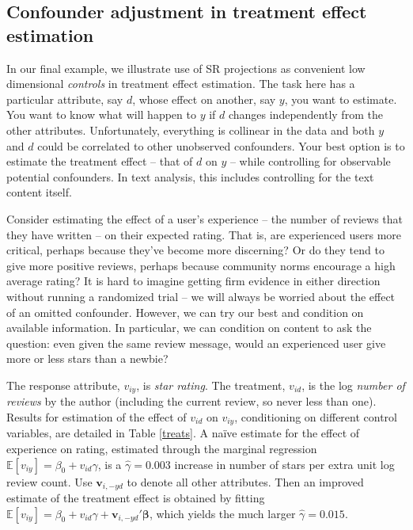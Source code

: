 \documentclass[12pt]{article}
\newcommand{\bs}[1]{\boldsymbol{#1}}
\newcommand{\bm}[1]{\mathbf{#1}}
\newcommand{\ds}[1]{\mathds{#1}}
\begin{document}
\subsection{Confounder adjustment in treatment effect estimation}

In our final example, we illustrate use of SR projections as convenient low
dimensional {\it controls} in treatment effect estimation.  The task here has
a particular attribute, say $d$, whose effect on another, say $y$, you want to
estimate.  You want to know what will happen to $y$ if $d$ changes
independently from  the other attributes.  Unfortunately, everything is
collinear in the data and both $y$ and $d$ could be correlated to other
unobserved confounders.  Your best option is to estimate the treatment effect
-- that of $d$ on $y$ -- while controlling for observable potential
confounders.  In text analysis, this includes controlling for the text content
itself.


Consider estimating the effect of a user's experience -- the number of reviews
that they have written -- on their expected rating.  That is, are experienced
users more critical, perhaps because they've become more discerning?  Or do
they tend to give more positive reviews, perhaps because community norms
encourage a high average rating? It is hard to imagine getting firm evidence
in either direction without running a randomized trial -- we will always be
worried about the effect of an omitted confounder.  However, we can try our
best and condition on available information.    In particular, we can
condition on  content to ask the question: even given the same review
message, would an experienced user give more or less stars than a newbie?

The response attribute, $v_{iy}$, is  {\it star rating}. The treatment, $v_{id}$, is the log {\it number of reviews} by the author
(including the current review, so never less than one).  Results for
estimation of the effect of $v_{id}$ on $v_{iy}$, conditioning on different
control variables, are detailed in Table \ref{treats}.   A na\"ive estimate
for the effect of experience on rating, estimated through the marginal
regression $\ds{E}[v_{iy}] = \beta_0 +  v_{id}\gamma$, is a $\hat\gamma =
0.003$ increase in number of stars per extra unit log review count. Use
$\bm{v}_{i,-yd}$ to denote all other attributes.  Then an improved estimate of
the treatment effect is obtained by fitting $\ds{E}[v_{iy}] = \beta_0 +
v_{id}\gamma +
\bm{v}_{i,-yd}'\bs{\beta}$, which yields the much larger $\hat\gamma = 0.015$.
\end{document}
